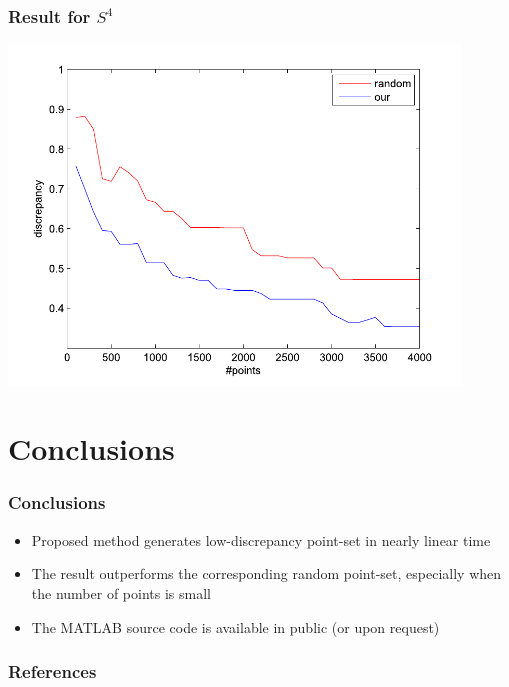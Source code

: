 \documentclass[serif]{beamer} %
\begin{document}
\begin{frame}
  \frametitle{Result for $S^4$}
  \centerline{\includegraphics[width=0.9\textwidth]{res_S4.pdf}}
\end{frame}

\section{Conclusions}
\begin{frame}
  \frametitle{Conclusions}
  \begin{itemize}
    \item Proposed method generates low-discrepancy point-set in nearly linear time
    \item The result outperforms the corresponding random point-set, especially when the number of points is small
    \item The MATLAB source code is available in public (or upon request)
  \end{itemize}
\end{frame}

\begin{frame}[allowframebreaks]
  \frametitle{References}
  \scriptsize{}
  
\end{frame}
\end{document}
